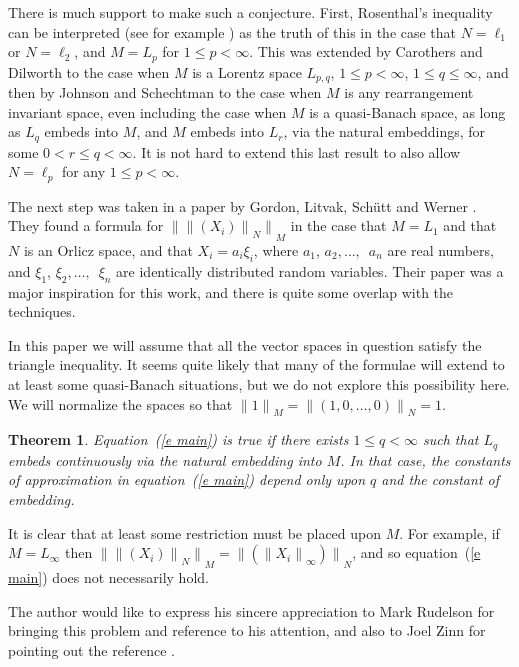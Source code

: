 \documentclass[12pt]{amsart}
\newtheorem{thm}{Theorem}
\newcommand{\snormo}[1]{{\mathopen\|#1\mathclose\|}}
\begin{document}
There is much support to make such a conjecture.  First, Rosenthal's
inequality \cite{rosenthal} can be interpreted (see for example 
\cite{carothers-dilworth})
as the truth of this in the case that $N = \ell_1$ or $N = \ell_2$,
and $M = L_p$ for $1 \le p < \infty$.  This was extended by
Carothers and Dilworth \cite{carothers-dilworth} to the case when
$M$ is a Lorentz space $L_{p,q}$, $1 \le p < \infty$, $1 \le q \le \infty$,
and then by Johnson and Schechtman \cite{johnson-schechtman} to the case
when $M$ is any rearrangement invariant space, even including the case
when $M$ is a quasi-Banach space, as long as $L_q$ embeds into $M$, and $M$ 
embeds into $L_r$, via the natural embeddings, for some $0<r\le q < \infty$.
It is not hard to extend this last result to also allow $N = \ell_p$ for any
$1 \le p < \infty$.

The next step was taken in a paper by 
Gordon, Litvak, Sch\"utt and Werner \cite{gordon et al}.
They found a formula for $\snormo{\snormo{(X_i)}_N}_M$ in the case that
$M = L_1$ and that $N$ is an Orlicz space, and that $X_i = a_i \xi_i$,
where $a_1$, $a_2,\dots,$\ $a_n$ are real numbers, and $\xi_1$, 
$\xi_2,\dots,$\ $\xi_n$ are identically distributed random variables.
Their paper was a major inspiration for this work, and there 
is quite some overlap with the techniques.

In this paper we will assume that all the vector spaces in question 
satisfy the triangle inequality.  It seems quite likely that many
of the formulae will extend to at least some quasi-Banach situations,
but we do not explore this possibility here.  We will normalize the
spaces so that $\snormo 1_M = \snormo{(1,0,\dots,0)}_N = 1$.

\begin{thm}
\label{t main}
Equation~(\ref{e main}) is true if there exists $1\le q < \infty$ such that 
$L_q$ embeds continuously via
the natural embedding into $M$.  In that case, the constants of approximation
in equation~(\ref{e main})
depend only upon $q$ and the constant of embedding.
\end{thm}

It is clear that at least some restriction must be placed upon $M$.  
For example,
if $M = L_\infty$ then $\snormo{\snormo{(X_i)}_N}_M = 
\snormo{(\snormo{X_i}_\infty)}_N$, and so equation~(\ref{e main})
does not necessarily hold.

The author would like to express his sincere appreciation to Mark Rudelson for
bringing this problem and reference \cite{gordon et al} to his attention,
and also to Joel Zinn for pointing out the reference \cite{marcus-zinn}.
\end{document}
